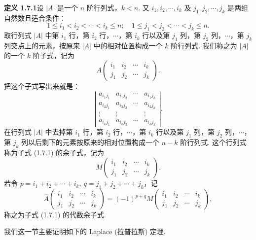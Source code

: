 \documentclass[UTF8,12pt,a4paper,fontset=fandol]{ctexart}
\begin{document}
\noindent\textbf{定义 1.7.1}\quad 设 $|A|$ 是一个 $n$ 阶行列式，$k<n$. 又 $i_1,i_2,\cdots,i_k$ 及 $j_1,j_2,\cdots,j_k$ 是两组自然数且适合条件：
\[
1\le i_1<i_2<\cdots<i_k\le n;\quad
1\le j_1<j_2<\cdots<j_k\le n.
\]
取行列式 $|A|$ 中第 $i_1$ 行，第 $i_2$ 行，$\cdots$，第 $i_k$ 行以及第 $j_1$ 列，第 $j_2$ 列，$\cdots$，第 $j_k$ 列交点上的元素，按原来 $|A|$ 中的相对位置构成一个 $k$ 阶行列式. 我们称之为 $|A|$ 的一个 $k$ 阶子式，记为
\begin{equation}
A\left(\begin{array}{cccc}
i_1 & i_2 & \cdots & i_k\\
j_1 & j_2 & \cdots & j_k
\end{array}\right).
\tag{1.7.1}
\end{equation}
把这个子式写出来就是：
\[
\left|\begin{array}{cccc}
a_{i_1j_1} & a_{i_1j_2} & \cdots & a_{i_1j_k}\\
a_{i_2j_1} & a_{i_2j_2} & \cdots & a_{i_2j_k}\\
\vdots & \vdots & & \vdots\\
a_{i_kj_1} & a_{i_kj_2} & \cdots & a_{i_kj_k}
\end{array}\right|.
\]
在行列式 $|A|$ 中去掉第 $i_1$ 行，第 $i_2$ 行，$\cdots$，第 $i_k$ 行以及第 $j_1$ 列，第 $j_2$ 列，$\cdots$，第 $j_k$ 列以后剩下的元素按原来的相对位置构成一个 $n-k$ 阶行列式. 这个行列式称为子式 (1.7.1) 的余子式，记为
\begin{equation}
M\left(\begin{array}{cccc}
i_1 & i_2 & \cdots & i_k\\
j_1 & j_2 & \cdots & j_k
\end{array}\right).
\tag{1.7.2}
\end{equation}
若令 $p=i_1+i_2+\cdots+i_k,\ q=j_1+j_2+\cdots+j_k$，记
\begin{equation}
\widehat{A}\left(\begin{array}{cccc}
i_1 & i_2 & \cdots & i_k\\
j_1 & j_2 & \cdots & j_k
\end{array}\right)
=(-1)^{p+q}
M\left(\begin{array}{cccc}
i_1 & i_2 & \cdots & i_k\\
j_1 & j_2 & \cdots & j_k
\end{array}\right),
\tag{1.7.3}
\end{equation}
称之为子式 (1.7.1) 的代数余子式.

我们这一节主要证明如下的 Laplace (拉普拉斯) 定理.
\end{document}
